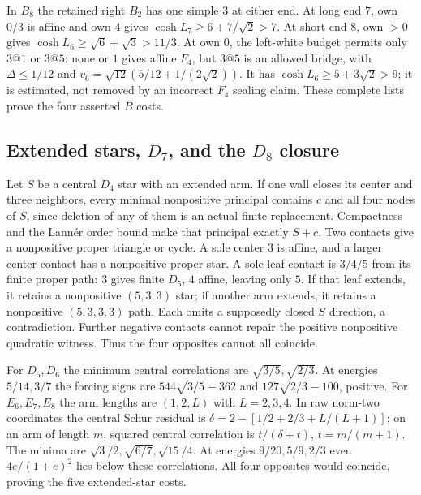 \documentclass[11pt]{article}
\theoremstyle{definition}
\theoremstyle{remark}
\begin{document}
In $B_8$ the retained right $B_2$ has one simple $3$ at either
end. At long end $7$, own $0/3$ is affine and own $4$ gives
$\cosh L_7\ge6+7/\sqrt2>7$.
At short end $8$, own $>0$ gives
$\cosh L_6\ge\sqrt6+\sqrt3>11/3$.
At own $0$, the left-white budget permits only $3@1$ or $3@5$:
none or $1$ gives affine $F_4$, but $3@5$ is an allowed bridge,
with $\Delta\le1/12$ and
$v_6=\sqrt{12}(5/12+1/(2\sqrt2))$.
It has $\cosh L_6\ge5+3\sqrt2>9$; it is estimated, not removed
by an incorrect $F_4$ sealing claim. These complete lists prove
the four asserted $B$ costs.

\subsection{Extended stars, \texorpdfstring{$D_7$}{D7}, and the \texorpdfstring{$D_8$}{D8} closure}

Let $S$ be a central $D_4$ star with an extended arm. If one wall
closes its center and three neighbors, every minimal nonpositive
principal contains $c$ and all four nodes of $S$, since deletion
of any of them is an actual finite replacement. Compactness and
the Lann\'er order bound make that principal exactly $S+c$.
Two contacts give a nonpositive proper triangle or cycle.
A sole center $3$ is affine, and a larger center contact has a
nonpositive proper star. A sole leaf contact is $3/4/5$ from its
finite proper path: $3$ gives finite $D_5$, $4$ affine, leaving
only $5$. If that leaf extends, it retains a nonpositive $(5,3,3)$
star; if another arm extends, it retains a nonpositive $(5,3,3,3)$
path. Each omits a supposedly closed $S$ direction, a contradiction.
Further negative contacts cannot repair the positive nonpositive
quadratic witness. Thus the four opposites cannot all coincide.

For $D_5,D_6$ the minimum central correlations are
$\sqrt{3/5},\sqrt{2/3}$. At energies $5/14,3/7$ the forcing
signs are $544\sqrt{3/5}-362$ and $127\sqrt{2/3}-100$, positive.
For $E_6,E_7,E_8$ the arm lengths are $(1,2,L)$ with $L=2,3,4$.
In raw norm-two coordinates the central Schur residual is
$\delta=2-[1/2+2/3+L/(L+1)]$; on an arm of length $m$, squared
central correlation is $t/(\delta+t)$, $t=m/(m+1)$.
The minima are $\sqrt3/2,\sqrt{6/7},\sqrt{15}/4$.
At energies $9/20,5/9,2/3$ even $4e/(1+e)^2$ lies below these
correlations. All four opposites would coincide, proving the five
extended-star costs.
\end{document}
